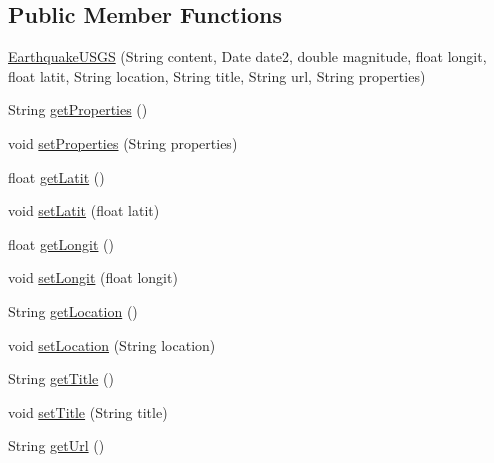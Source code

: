 \subsection*{Public Member Functions}
\begin{DoxyCompactItemize}
\item 
\hyperlink{classbridges_1_1data__src__dependent_1_1_earthquake_u_s_g_s_a681da199afeab00ae170416841f235e2}{Earthquake\+U\+S\+GS} (String content, Date date2, double magnitude, float longit, float latit, String location, String title, String url, String properties)
\item 
String \hyperlink{classbridges_1_1data__src__dependent_1_1_earthquake_u_s_g_s_a6676a3f0a11accf6a510648601e05310}{get\+Properties} ()
\item 
void \hyperlink{classbridges_1_1data__src__dependent_1_1_earthquake_u_s_g_s_a2e1ee813dc91081bbd8fd8f5b343f080}{set\+Properties} (String properties)
\item 
float \hyperlink{classbridges_1_1data__src__dependent_1_1_earthquake_u_s_g_s_aa5cacca326360e4aa7179945d51bb9dc}{get\+Latit} ()
\item 
void \hyperlink{classbridges_1_1data__src__dependent_1_1_earthquake_u_s_g_s_a528016222b87f80642073396af6a10ed}{set\+Latit} (float latit)
\item 
float \hyperlink{classbridges_1_1data__src__dependent_1_1_earthquake_u_s_g_s_abcffa65a7ec00dbb617e08d08328bbf3}{get\+Longit} ()
\item 
void \hyperlink{classbridges_1_1data__src__dependent_1_1_earthquake_u_s_g_s_a460d2cf865cfa3a56bbcab8811067bee}{set\+Longit} (float longit)
\item 
String \hyperlink{classbridges_1_1data__src__dependent_1_1_earthquake_u_s_g_s_a703492ad551b68ab6b7821646f9a92ec}{get\+Location} ()
\item 
void \hyperlink{classbridges_1_1data__src__dependent_1_1_earthquake_u_s_g_s_a473107844daa1ef938dd1b78e585185b}{set\+Location} (String location)
\item 
String \hyperlink{classbridges_1_1data__src__dependent_1_1_earthquake_u_s_g_s_a6aa71b4b565be3971c8d3dfae31cb6ed}{get\+Title} ()
\item 
void \hyperlink{classbridges_1_1data__src__dependent_1_1_earthquake_u_s_g_s_a0432f641e0089fc004c441b7239ad6a0}{set\+Title} (String title)
\item 
String \hyperlink{classbridges_1_1data__src__dependent_1_1_earthquake_u_s_g_s_a2af3938390c31096329e635510df437e}{get\+Url} ()
\item 

\end{DoxyCompactItemize}
